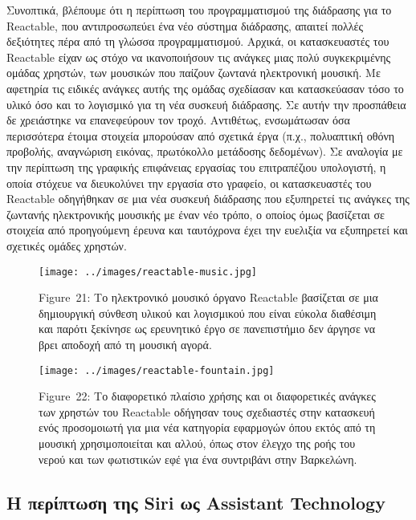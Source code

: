 \documentclass[
]{article}
\begin{document}
Συνοπτικά, βλέπουμε ότι η περίπτωση του προγραμματισμού της διάδρασης
για το Reactable, που αντιπροσωπεύει ένα νέο σύστημα διάδρασης, απαιτεί
πολλές δεξιότητες πέρα από τη γλώσσα προγραμματισμού. Αρχικά, οι
κατασκευαστές του Reactable είχαν ως στόχο να ικανοποιήσουν τις ανάγκες
μιας πολύ συγκεκριμένης ομάδας χρηστών, των μουσικών που παίζουν ζωντανά
ηλεκτρονική μουσική. Με αφετηρία τις ειδικές ανάγκες αυτής της ομάδας
σχεδίασαν και κατασκεύασαν τόσο το υλικό όσο και το λογισμικό για τη νέα
συσκευή διάδρασης. Σε αυτήν την προσπάθεια δε χρειάστηκε να επανεφεύρουν
τον τροχό. Αντιθέτως, ενσωμάτωσαν όσα περισσότερα έτοιμα στοιχεία
μπορούσαν από σχετικά έργα (π.χ., πολυαπτική οθόνη προβολής, αναγνώριση
εικόνας, πρωτόκολλο μετάδοσης δεδομένων). Σε αναλογία με την περίπτωση
της γραφικής επιφάνειας εργασίας του επιτραπέζιου υπολογιστή, η οποία
στόχευε να διευκολύνει την εργασία στο γραφείο, οι κατασκευαστές του
Reactable οδηγήθηκαν σε μια νέα συσκευή διάδρασης που εξυπηρετεί τις
ανάγκες της ζωντανής ηλεκτρονικής μουσικής με έναν νέο τρόπο, ο οποίος
όμως βασίζεται σε στοιχεία από προηγούμενη έρευνα και ταυτόχρονα έχει
την ευελιξία να εξυπηρετεί και σχετικές ομάδες χρηστών.

\leavevmode{}%
\begin{figure}
\hypertarget{fig:reactable-music}{%
\centering
\texttt{[image: ../images/reactable-music.jpg]}
\caption{Figure~21: Το ηλεκτρονικό μουσικό όργανο Reactable βασίζεται σε
μια δημιουργική σύνθεση υλικού και λογισμικού που είναι εύκολα διαθέσιμη
και παρότι ξεκίνησε ως ερευνητικό έργο σε πανεπιστήμιο δεν άργησε να
βρει αποδοχή από τη μουσική αγορά.}\label{fig:reactable-music}
}
\end{figure}

\leavevmode{}%
\begin{figure}
\hypertarget{fig:reactable-fountain}{%
\centering
\texttt{[image: ../images/reactable-fountain.jpg]}
\caption{Figure~22: Το διαφορετικό πλαίσιο χρήσης και οι διαφορετικές
ανάγκες των χρηστών του Reactable οδήγησαν τους σχεδιαστές στην
κατασκευή ενός προσομοιωτή για μια νέα κατηγορία εφαρμογών όπου εκτός
από τη μουσική χρησιμοποιείται και αλλού, όπως στον έλεγχο της ροής του
νερού και των φωτιστικών εφέ για ένα συντριβάνι στην
Βαρκελώνη.}\label{fig:reactable-fountain}
}
\end{figure}

\hypertarget{ux3b7-ux3c0ux3b5ux3c1ux3afux3c0ux3c4ux3c9ux3c3ux3b7-ux3c4ux3b7ux3c2-siri-ux3c9ux3c2-assistant-technology}{%
\subsection{Η περίπτωση της Siri ως Assistant
Technology}\label{ux3b7-ux3c0ux3b5ux3c1ux3afux3c0ux3c4ux3c9ux3c3ux3b7-ux3c4ux3b7ux3c2-siri-ux3c9ux3c2-assistant-technology}}
\end{document}
